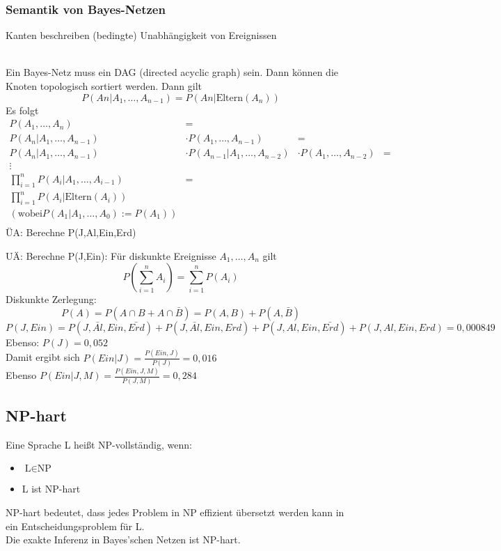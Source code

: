 \documentclass[a4paper]{scrartcl}
\begin{document}
\subsubsection{Semantik von Bayes-Netzen}
Kanten beschreiben (bedingte) Unabhängigkeit von Ereignissen\\
\\
Ein Bayes-Netz muss ein DAG (directed acyclic graph) sein. Dann können die Knoten topologisch sortiert werden. Dann gilt
\[ P(An| A_1, \dots , A_{n-1}) = P(An | \text{Eltern} (A_n)) \]
Es folgt
\begin{align*} P(A_1,\dots,A_n) &= \\
P(A_n|A_1,\dots,A_{n-1}) &\cdot P(A_1,\dots,A_{n-1}) &=\\
P(A_n |A_1,\dots,A_{n-1}) &\cdot P(A_{n-1} | A_1,\dots,A_{n-2}) &\cdot P(A_1,\dots,A_{n-2}) &= \\
\vdots \\
\prod\limits_{i=1}^{n} P(A_i | A_1, \dots, A_{i-1}) &= \\
\prod\limits_{i=1}^n P(A_i |\text{Eltern} (A_i))\\
(\text{wobei} P(A_1 | A_1,\dots,A_0) := P(A_1))\\
\end{align*}
ÜA: Berechne P(J,Al,Ein,Erd)

UÄ: Berechne P(J,Ein): Für diskunkte Ereignisse $A_1,\dots,A_n$ gilt
\[ P(\sum\limits_{i=1}^n A_i) = \sum\limits_{i=1}^n P(A_i) \]
Diskunkte Zerlegung:
\[ P(A) = P(A\cap B + A\cap \bar{B} ) = P(A,B) + P(A,\bar{B}) \]
\[ P(J,Ein) = P(J,\bar{Al},Ein,\bar{Erd}) + P(J,\bar{Al},Ein,Erd) + P(J,Al,Ein,\bar{Erd}) + P(J,Al,Ein,Erd) = 0,000849 \]
Ebenso: $P(J) = 0,052$\\
Damit ergibt sich $P(Ein|J)= \frac{P(Ein,J)}{P(J)} = 0,016 $\\
Ebenso $P(Ein | J,M) = \frac{P(Ein,J,M)}{P(J,M)} = 0,284$

\subsection{NP-hart} Eine Sprache L heißt NP-vollständig, wenn:
\begin{itemize}
\item $\text{L} \in \text{NP}$
\item L ist NP-hart
\end{itemize}
NP-hart bedeutet, dass jedes Problem in NP effizient übersetzt werden kann in ein Entscheidungsproblem für L.\\
Die exakte Inferenz in Bayes'schen Netzen ist NP-hart.
\end{document}
